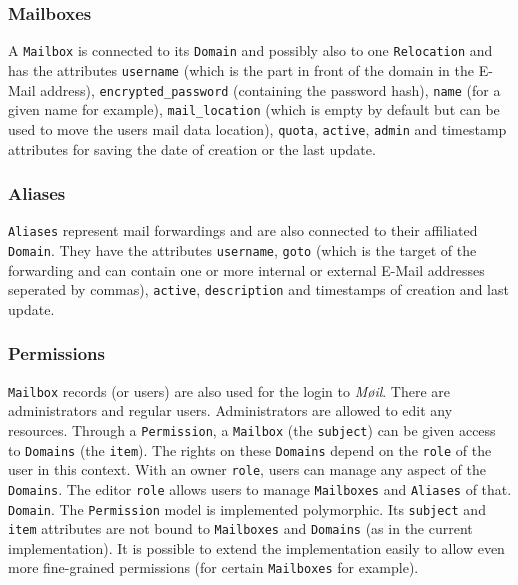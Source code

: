 \documentclass[12pt,a4paper]{scrartcl}
\begin{document}
			\subsubsection*{Mailboxes}
				A \texttt{Mailbox} is connected to its \texttt{Domain} and
				possibly also to one \texttt{Relocation} and has the attributes
				\texttt{username} (which is the part in front of the
				domain in the E-Mail address), \texttt{encrypted\_password}
				(containing the password hash), \texttt{name} (for a given name
				for example), \texttt{mail\_location} (which is empty by
				default but can be used to move the users mail data location),
				\texttt{quota}, \texttt{active}, \texttt{admin} and timestamp
				attributes for saving the date of creation or the last update.

			\subsubsection*{Aliases}
				\texttt{Aliases} represent mail forwardings and are also
				connected to their affiliated \texttt{Domain}. They have the
				attributes \texttt{username}, \texttt{goto} (which is the
				target of the forwarding and can contain one or more internal
				or external E-Mail addresses seperated by commas),
				\texttt{active}, \texttt{description} and timestamps of
				creation and last update.

			\subsubsection*{Permissions}
				\texttt{Mailbox} records (or users) are also used for the login
				to \emph{Møil}. There are administrators and regular users.
				Administrators are allowed to edit any resources. Through a
				\texttt{Permission}, a \texttt{Mailbox} (the \texttt{subject})
				can be given access to \texttt{Domains} (the \texttt{item}).
				The rights on these \texttt{Domains} depend on the
				\texttt{role} of the user in this context. With an owner
				\texttt{role}, users can manage any aspect of the
				\texttt{Domains}. The editor \texttt{role} allows users to
				manage \texttt{Mailboxes} and \texttt{Aliases} of that.
				\texttt{Domain}. The \texttt{Permission} model is implemented
				polymorphic. Its \texttt{subject} and \texttt{item} attributes
				are not bound to \texttt{Mailboxes} and \texttt{Domains} (as in
				the current implementation). It is possible to extend the
				implementation easily to allow even more fine-grained
				permissions (for certain \texttt{Mailboxes} for example).
\end{document}
